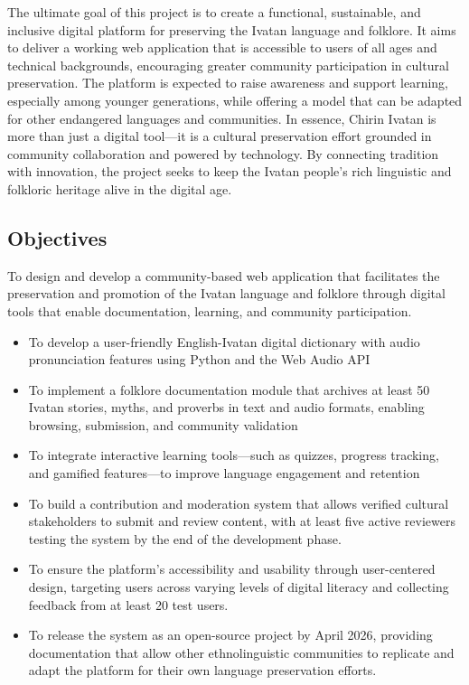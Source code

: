             The ultimate goal of this project is to create a functional, sustainable, and inclusive digital platform for preserving the Ivatan language and folklore. It aims to deliver a working web application that is accessible to users of all ages and technical backgrounds, encouraging greater community participation in cultural preservation. The platform is expected to raise awareness and support learning, especially among younger generations, while offering a model that can be adapted for other endangered languages and communities. In essence, Chirin Ivatan is more than just a digital tool—it is a cultural preservation effort grounded in community collaboration and powered by technology. By connecting tradition with innovation, the project seeks to keep the Ivatan people's rich linguistic and folkloric heritage alive in the digital age.


    \subsection{Objectives}
        To design and develop a community-based web application that facilitates the preservation and promotion of the Ivatan language and folklore through digital tools that enable documentation, learning, and community participation.
            \begin{itemize}
                \item To develop a user-friendly English-Ivatan digital dictionary with audio pronunciation features using Python and the Web Audio API
                \item To implement a folklore documentation module that archives at least 50 Ivatan stories, myths, and proverbs in text and audio formats, enabling browsing, submission, and community validation 
                \item To integrate interactive learning tools—such as quizzes, progress tracking, and gamified features—to improve language engagement and retention
                \item To build a contribution and moderation system that allows verified cultural stakeholders to submit and review content, with at least five active reviewers testing the system by the end of the development phase.
                \item To ensure the platform’s accessibility and usability through user-centered design, targeting users across varying levels of digital literacy and collecting feedback from at least 20 test users.
                \item To release the system as an open-source project by April 2026, providing documentation that allow other ethnolinguistic communities to replicate and adapt the platform for their own language preservation efforts.
            \end{itemize}
            

